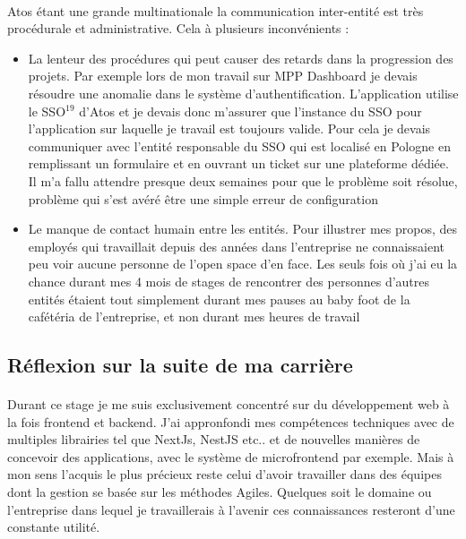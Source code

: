\documentclass[12pt]{article}
\begin{document}
\begin {sloppypar}
\paragraph{}
Atos étant une grande multinationale la communication inter-entité est très procédurale et 
administrative. Cela à plusieurs inconvénients : 
\begin{itemize}
  \item 
    La lenteur des procédures qui peut causer des retards dans la progression des projets. Par exemple lors de mon travail 
    sur MPP Dashboard je devais résoudre une anomalie dans le système d'authentification. L'application utilise 
    le SSO$^{19}$ d'Atos et je devais donc m'assurer que l'instance du SSO pour l'application sur laquelle je travail 
    est toujours valide. Pour cela je devais communiquer avec l'entité responsable du SSO qui est localisé en Pologne 
    en remplissant un formulaire et en ouvrant un ticket sur une plateforme dédiée. Il m'a fallu attendre presque 
    deux semaines pour que le problème soit résolue, problème qui s'est avéré être une simple erreur de configuration
  \item 
    Le manque de contact humain entre les entités. Pour illustrer mes propos, des employés qui travaillait depuis
    des années dans l'entreprise ne connaissaient peu voir aucune personne de l'open space d'en face. Les 
    seuls fois où j'ai eu la chance durant mes 4 mois de stages de rencontrer des personnes d'autres entités étaient
    tout simplement durant mes pauses au baby foot de la cafétéria de l'entreprise, et non durant mes heures de travail
\end{itemize}
\newpage
\subsection{Réflexion sur la suite de ma carrière}
\paragraph{}
Durant ce stage je me suis exclusivement concentré sur du développement web à la fois frontend
et backend. J'ai appronfondi mes compétences techniques avec de multiples librairies tel que NextJs,
NestJS etc.. et de nouvelles manières de concevoir des applications, avec le système de microfrontend
par exemple. Mais à mon sens l'acquis le plus précieux reste celui d'avoir travailler dans des équipes
dont la gestion se basée sur les méthodes Agiles. Quelques soit le domaine ou l'entreprise dans lequel je travaillerais 
à l'avenir ces connaissances resteront d'une constante utilité.


\end{sloppypar}
\end{document}
